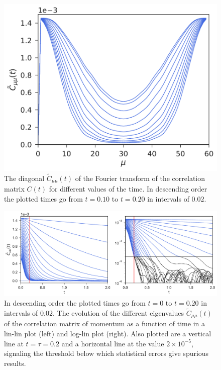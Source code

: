 \documentclass[a4paper,openright,12pt]{book}
\begin{document}
\begin{figure}[h!]
  \centering
  \includegraphics[scale=0.45]{CtFourier-PBC}
  \caption[Diagonal $\tilde{C}_{\mu\nu}(t)$]{The diagonal $\tilde{C}_{\mu\mu}(t)$ of the Fourier transform
  of the correlation  matrix $C(t)$ for different values  of the time.
In      descending     order      the     plotted      times go from $t=0.10$ to $t=0.20$ in intervals of $0.02$. }
\label{fig:CtFourier-PBC}
\end{figure}

\begin{figure}[h!]
  \centering
  \includegraphics[scale=0.45]{CtFourier-PBC-exp}
  \caption[Evolution of different eigenvalues $\tilde{C}_{\mu\nu}(t)$]{
  In      descending     order      the     plotted      times     go from
  $t=0$ to $t=0.20$ in intervals of $0.02$.  The  evolution of  the different
  eigenvalues  $\tilde{C}_{\mu\mu}(t)$ of  the  correlation matrix  of
  momentum  as  a  function  of   time  in  a  lin-lin  plot  (left)
  and   log-lin   plot
  (right). Also  plotted are  a vertical line  at $t=\tau=0.2$  and a
  horizontal  line  at  the   value  $2\times10^{-5}$,  signaling  the
  threshold below which statistical errors give spurious results. }
\label{fig:CtFourier-PBC-exp}
\end{figure}
\end{document}
